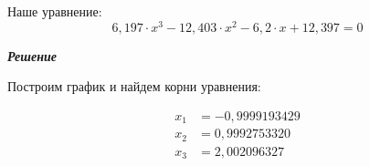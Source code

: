 \documentclass[12pt]{article}
\begin{document}
Наше уравнение:
\begin{equation*}
	6,197 \cdot x^3 - 12,403 \cdot x^2 -
	6,2 \cdot x + 12,397 = 0
\end{equation*}
\begin{center}
	\textbf{\textit{Решение}}
\end{center}
Построим график и найдем корни уравнения:
\begin{figure}[h]%
	\centering
\end{figure}
\begin{equation*}
	\begin{split}
		x_1 & = -0,9999193429 \\
		x_2 & = 0,9992753320 \\
		x_3 & = 2,002096327
	\end{split}
\end{equation*}
\end{document}
